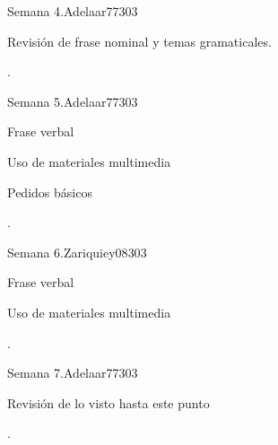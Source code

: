 \begin{syllabus}
\begin{unit}{}{Semana 4.}{Adelaar77}{30}{3}
   \begin{topics}
      \item Revisión de frase nominal y temas gramaticales.
   \end{topics}

   \begin{learningoutcomes}
      \item .
   \end{learningoutcomes}
\end{unit}

\begin{unit}{}{Semana 5.}{Adelaar77}{30}{3}
   \begin{topics}
      \item Frase verbal
      \item Uso de materiales multimedia
      \item Pedidos básicos
   \end{topics}

   \begin{learningoutcomes}
      \item .
   \end{learningoutcomes}
\end{unit}

\begin{unit}{}{Semana 6.}{Zariquiey08}{30}{3}
   \begin{topics}
      \item Frase verbal
      \item Uso de materiales multimedia
   \end{topics}

   \begin{learningoutcomes}
      \item .
   \end{learningoutcomes}
\end{unit}

\begin{unit}{}{Semana 7.}{Adelaar77}{30}{3}
   \begin{topics}
      \item Revisión de lo visto hasta este punto
   \end{topics}

   \begin{learningoutcomes}
      \item .
   \end{learningoutcomes}
\end{unit}


\end{syllabus}
